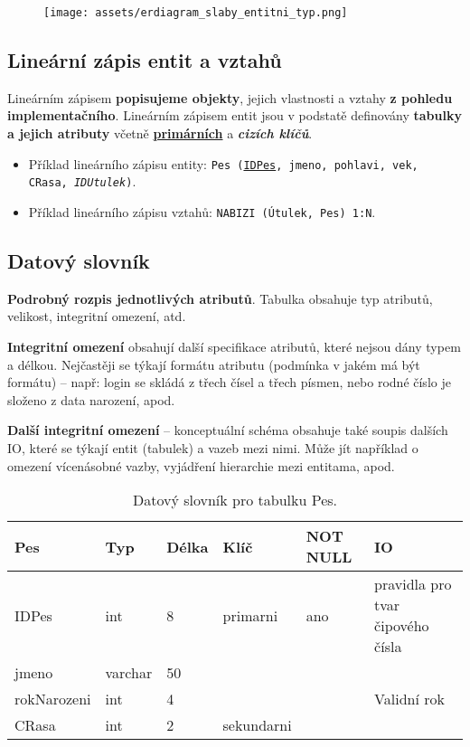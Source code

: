 \begin{figure}[H]
    \centering
    \texttt{[image: assets/erdiagram\_slaby\_entitni\_typ.png]}
\end{figure}

\subsection{Lineární zápis entit a vztahů}
Lineárním zápisem \textbf{popisujeme objekty}, jejich vlastnosti a vztahy \textbf{z pohledu implementačního}. Lineárním zápisem entit jsou v podstatě definovány \textbf{tabulky a jejich atributy} včetně \underline{\textbf{primárních}} a \textbf{\textit{cizích klíčů}}.

\begin{itemize}
    \item Příklad lineárního zápisu entity: \texttt{Pes (\underline{IDPes}, jmeno, pohlavi, vek, CRasa, \textit{IDUtulek})}.
    \item Příklad lineárního zápisu vztahů: \texttt{NABIZI (Útulek, Pes) 1:N}.
\end{itemize}

\subsection{Datový slovník}
\textbf{Podrobný rozpis jednotlivých atributů}. Tabulka obsahuje typ atributů, velikost, integritní omezení, atd.

\textbf{Integritní omezení} obsahují další specifikace atributů, které nejsou dány typem a délkou. Nejčastěji se týkají formátu atributu (podmínka v jakém má být formátu) -- např: login se skládá z třech čísel a třech písmen, nebo rodné číslo je složeno z data narození, apod.

\textbf{Další integritní omezení} -- konceptuální schéma obsahuje také soupis dalších IO, které se týkají entit (tabulek) a vazeb mezi nimi. Může jít například o omezení vícenásobné vazby, vyjádření hierarchie mezi entitama, apod.

\begin{table}[H]
    \centering
    \begin{tabular}{|l|l|l|l|l|l|}
        \hline
        \textbf{Pes} & \textbf{Typ} & \textbf{Délka} & \textbf{Klíč} & \textbf{NOT NULL} & \textbf{IO}                      \\ \hline
        IDPes        & int          & 8              & primarni      & ano               & pravidla pro tvar čipového čísla \\ \hline
        jmeno        & varchar      & 50             &               &                   &                                  \\ \hline
        rokNarozeni  & int          & 4              &               &                   & Validní rok                      \\ \hline
        CRasa        & int          & 2              & sekundarni    &                   &                                  \\ \hline
    \end{tabular}
    \caption{Datový slovník pro tabulku Pes.}
\end{table}

